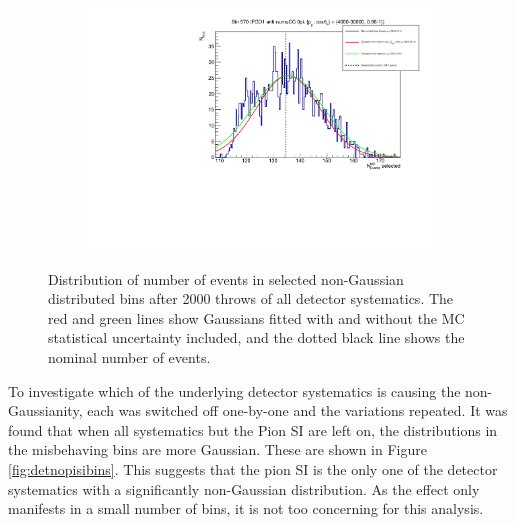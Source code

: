 \begin{figure}[h]
\begin{subfigure}{.49\textwidth}
\end{subfigure}
\begin{subfigure}{.49\textwidth}
  \centering
  \includegraphics[width=0.95\linewidth]{figs/detbin_allsysts570}
\end{subfigure}
\caption{Distribution of number of events in selected non-Gaussian distributed bins after 2000 throws of all detector systematics. The red and green lines show Gaussians fitted with and without the MC statistical uncertainty included, and the dotted black line shows the nominal number of events.}
\label{fig:detnongaussbins}
\end{figure}

To investigate which of the underlying detector systematics is causing the non-Gaussianity, each was switched off one-by-one and the variations repeated. It was found that when all systematics but the Pion SI are left on, the distributions in the misbehaving bins are more Gaussian. These are shown in Figure \ref{fig:detnopisibins}. This suggests that the pion SI is the only one of the detector systematics with a significantly non-Gaussian distribution. As the effect only manifests in a small number of bins, it is not too concerning for this analysis.

